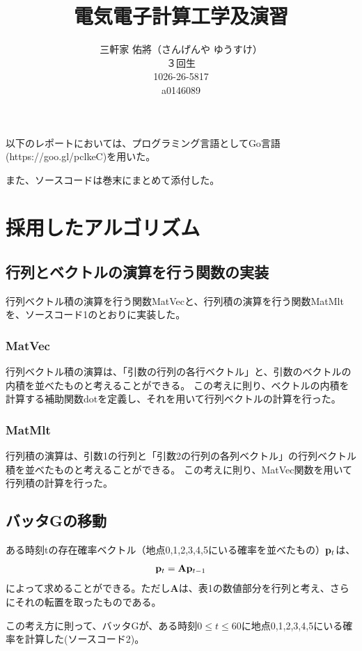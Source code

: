 \documentclass[11pt]{ltjsarticle}
\title{電気電子計算工学及演習}
\author{三軒家 佑將（さんげんや ゆうすけ） \\ ３回生 \\ 1026-26-5817 \\ a0146089}
\date{}
\begin{document}
\maketitle


以下のレポートにおいては、プログラミング言語としてGo言語(https://goo.gl/pclkeC)を用いた。

また、ソースコードは巻末にまとめて添付した。

\section{採用したアルゴリズム}
\subsection{行列とベクトルの演算を行う関数の実装}
	行列ベクトル積の演算を行う関数MatVecと、行列積の演算を行う関数MatMltを、ソースコード1のとおりに実装した。
	\subsubsection*{MatVec}
		行列ベクトル積の演算は、「引数の行列の各行ベクトル」と、引数のベクトルの内積を並べたものと考えることができる。
		この考えに則り、ベクトルの内積を計算する補助関数dotを定義し、それを用いて行列ベクトルの計算を行った。
	\subsubsection*{MatMlt}
		行列積の演算は、引数1の行列と「引数2の行列の各列ベクトル」の行列ベクトル積を並べたものと考えることができる。
		この考えに則り、MatVec関数を用いて行列積の計算を行った。

\subsection{バッタGの移動}
	ある時刻tの存在確率ベクトル（地点0,1,2,3,4,5にいる確率を並べたもの）${\bf p}_t$は、
	\[
		{\bf p}_t = {\bf A}{\bf p}_{t-1}
	\]
	によって求めることができる。ただし{\bf A}は、表1の数値部分を行列と考え、さらにそれの転置を取ったものである。
	
	この考え方に則って、バッタGが、ある時刻$0 \leq t \leq 60$に地点0,1,2,3,4,5にいる確率を計算した(ソースコード2)。
\end{document}
